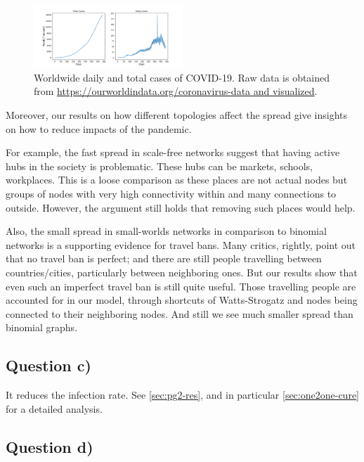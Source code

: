 \documentclass[conference]{IEEEtran}
\begin{document}
\begin{figure}[htb]
  \begin{center}
	\includegraphics[width=0.5\textwidth]{img/pandemic.pdf}
  \end{center}
	\caption{Worldwide daily and total cases of COVID-19. Raw data is obtained from \url{https://ourworldindata.org/coronavirus-data and visualized}.}
	\label{fig:pandemic}
\end{figure}

Moreover, our results on how different topologies affect the spread give insights on how to reduce impacts of the pandemic.

For example, the fast spread in scale-free networks suggest that having active hubs in the society is problematic. These hubs can be markets, schools, workplaces. This is a loose comparison as these places are not actual nodes but groups of nodes with very high connectivity within and many connections to outside. However, the argument still holds that removing such places would help.

Also, the small spread in small-worlds networks in comparison to binomial networks is a supporting evidence for travel bans. Many critics, rightly, point out that no travel ban is perfect; and there are still people travelling between countries/cities, particularly between neighboring ones. But our results show that even such an imperfect travel ban is still quite useful. Those travelling people are accounted for in our model, through shortcuts of Watts-Strogatz and nodes being connected to their neighboring nodes. And still we see much smaller spread than binomial graphs.

\subsection{Question c)}

It reduces the infection rate. See \autoref{sec:pg2-res}, and in particular \autoref{sec:one2one-cure} for a detailed analysis.

\subsection{Question d)}
\end{document}

